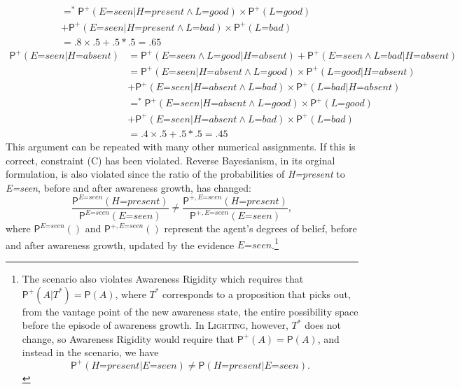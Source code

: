 \documentclass[
  11pt,
  dvipsnames,enabledeprecatedfontcommands]{scrartcl}
\newcommand{\pr}[1]{\ensuremath{\mathsf{P}(#1)}}
\newcommand{\ppr}[2]{\ensuremath{\mathsf{P}^{#1}(#2)}}
\begin{document}
{\begin{align*}
  &=^* \ppr{+}{\textit{E=seen} \vert \textit{H=present} \wedge \textit{L=good}}  \times \ppr{+}{\textit{L=good}}\\ & +\ppr{+}{\textit{E=seen}  \vert \textit{H=present} \wedge \textit{L=bad}} \times \ppr{+}{\textit{L=bad}}\\
  &= .8 \times .5 +.5 *.5 = .65 
  \end{align*} \begin{align*}
  \ppr{+}{\textit{E=seen} \vert \textit{H=absent}} &= \ppr{+}{\textit{E=seen} \wedge \textit{L=good} \vert \textit{H=absent}}+\ppr{+}{\textit{E=seen} \wedge \textit{L=bad} \vert \textit{H=absent}}\\
  &= \ppr{+}{\textit{E=seen} \vert \textit{H=absent} \wedge \textit{L=good}}  \times \ppr{+}{\textit{L=good} \vert  \textit{H=absent} }\\ & +\ppr{+}{\textit{E=seen}  \vert \textit{H=absent} \wedge \textit{L=bad}} \times \ppr{+}{\textit{L=bad} \vert  \textit{H=absent}}\\
  &=^* \ppr{+}{\textit{E=seen} \vert \textit{H=absent} \wedge \textit{L=good}}  \times \ppr{+}{\textit{L=good}}\\ & +\ppr{+}{\textit{E=seen}  \vert \textit{H=absent} \wedge \textit{L=bad}} \times \ppr{+}{\textit{L=bad}}\\
  &= .4 \times .5 +.5 *.5 = .45 
  \end{align*} This argument can be repeated with many other numerical
  assignments.} If this is correct, constraint (C) has been violated.
Reverse Bayesianism, in its orginal formulation, is also violated since
the ratio of the probabilities of \textit{H=present} to \textit{E=seen},
before and after awareness growth, has changed:
\[\frac{\ppr{\textit{E=seen}}{\textit{H=present}}}{\ppr{ \textit{E=seen}}{\textit{E=seen}}} \neq \frac{\ppr{+, \textit{E=seen}}{\textit{H=present}}}{\ppr{+, \textit{E=seen}}{\textit{E=seen}}},\]
where \(\ppr{\textit{E=seen}}{}\) and \(\ppr{+, \textit{E=seen}}{}\)
represent the agent's degrees of belief, before and after awareness
growth, updated by the evidence \(\textit{E=seen}\).\footnote{The
  scenario also violates Awareness Rigidity which requires that
  \(\ppr{+}{A \vert T^*}=\pr{A}\), where \(T^*\) corresponds to a
  proposition that picks out, from the vantage point of the new
  awareness state, the entire possibility space before the episode of
  awareness growth. In \textsc{Lighting}, however, \(T^*\) does not
  change, so Awareness Rigidity would require that
  \(\ppr{+}{A}=\pr{A}\), and instead in the scenario, we have
  \[\ppr{+}{\textit{H=present} \vert \textit{E=seen}} \neq \pr{\textit{H=present} \vert \textit{E=seen}}.\]}
\end{document}
